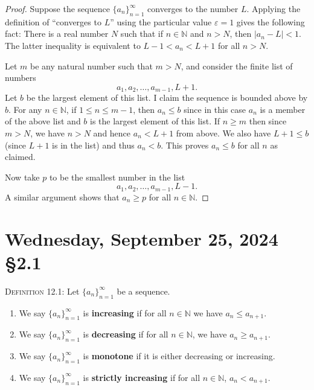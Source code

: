 \documentclass[12pt]{amsart}
\def\We{Wednesday}
\def\e{\varepsilon}
\newcommand{\N}{\mathbb{N}}
\numberwithin{equation}{section}
\theoremstyle{plain} %
\newcommand{\Sept}[3]{\section{#2, September #1, 2024 \quad \S#3}}
\theoremstyle{definition}
\theoremstyle{remark}
\begin{document}
\begin{proof} Suppose the sequence $\{a_n\}_{n=1}^\infty$ converges to
	the number $L$. Applying the definition of ``converges to $L$'' using the particular value $\e = 1$ gives the following fact:
	There is a real number $N$ such that if $n \in \N$ and $n > N$, then $|a_n -
	L| < 1$. The latter inequality is equivalent to  $L-1 < a_n < L+1$
	for all $n > N$.
	
	Let $m$ be any natural number such that $m > N$,
	and consider the finite list of numbers
	$$
	a_1, a_2, \dots, a_{m-1}, L + 1.
	$$
	Let $b$ be the largest element of this list. I claim the sequence is bounded above by $b$.
	For any $n \in  \N$, if $1 \leq n \leq m-1$, then $a_n \leq b$ since in this case $a_n$ is a member of the above list and $b$ is the largest element of this list.
	If $n \geq m$ then since $m > N$, we have $n > N$ and hence $a_n < L + 1$ from above. We also have $L + 1 \leq b$ (since $L+1$ is in the list) and thus $a_n < b$. 
	This proves $a_n \leq b$ for all $n$ as claimed.
	
	Now take $p$ to be the smallest number in the list
	$$
	a_1, a_2, \dots, a_{m-1}, L - 1.
	$$
	A similar argument shows that $a_n \geq p$ for all $n \in \N$.
\end{proof}




\Sept{25}{\We}{2.1}

\begin{framed}
\noindent \textsc{Definition 12.1:} Let $\{a_n\}_{n=1}^{\infty}$ be a sequence.
\begin{enumerate}
\item We say $\{a_n\}_{n=1}^\infty$ is  \textbf{increasing} if for all $n \in \N$ we have $a_n \leq a_{n+1}$.
\item We say $\{a_n\}_{n=1}^\infty$ is  \textbf{decreasing} if for all $n \in \N$, we have $a_n \geq a_{n+1}$.\item We say $\{a_n\}_{n=1}^\infty$ is  \textbf{monotone} if it is either decreasing or increasing.
\item We say $\{a_n\}_{n=1}^\infty$ is  \textbf{strictly increasing} if for all $n \in \N$, $a_n < a_{n+1}$.
\end{enumerate}
\end{framed}
\end{document}
